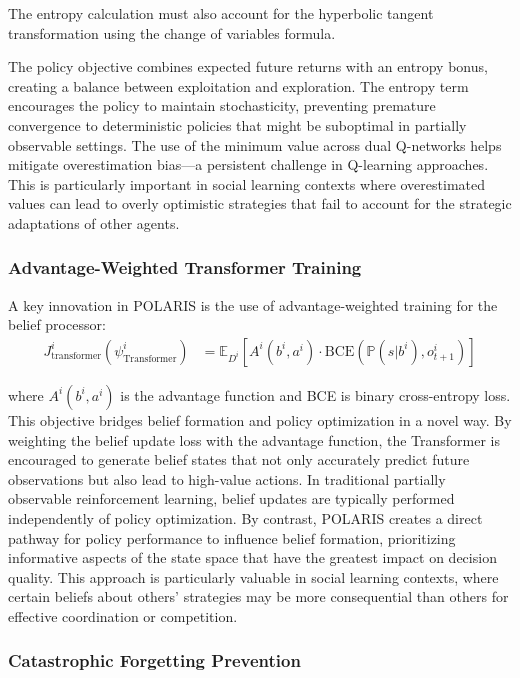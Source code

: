 The entropy calculation must also account for the hyperbolic tangent transformation using the change of variables formula.

The policy objective combines expected future returns with an entropy bonus, creating a balance between exploitation and exploration. The entropy term encourages the policy to maintain stochasticity, preventing premature convergence to deterministic policies that might be suboptimal in partially observable settings. The use of the minimum value across dual Q-networks helps mitigate overestimation bias—a persistent challenge in Q-learning approaches. This is particularly important in social learning contexts where overestimated values can lead to overly optimistic strategies that fail to account for the strategic adaptations of other agents.


\subsubsection{Advantage-Weighted Transformer Training} A key innovation in POLARIS is the use of advantage-weighted training for the belief processor:
\begin{align}
    J^i_{\text{transformer}}(\psi^i_{\text{Transformer}}) &= \mathbb{E}_{D^i}\left[A^i(b^i, a^i) \cdot \text{BCE}(\mathbb{P}(s|b^i), o^i_{t+1})\right]
\end{align}

where $A^i(b^i, a^i)$ is the advantage function and BCE is binary cross-entropy loss. This objective bridges belief formation and policy optimization in a novel way. By weighting the belief update loss with the advantage function, the Transformer is encouraged to generate belief states that not only accurately predict future observations but also lead to high-value actions. In traditional partially observable reinforcement learning, belief updates are typically performed independently of policy optimization. By contrast, POLARIS creates a direct pathway for policy performance to influence belief formation, prioritizing informative aspects of the state space that have the greatest impact on decision quality. This approach is particularly valuable in social learning contexts, where certain beliefs about others' strategies may be more consequential than others for effective coordination or competition.

\subsubsection{Catastrophic Forgetting Prevention}

